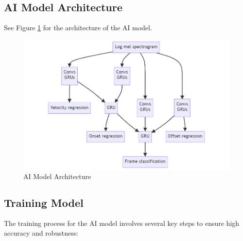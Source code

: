 \documentclass{article}
\begin{document}
\subsection{AI Model Architecture}
See Figure \ref{fig:ai_model_architecture} for the architecture of the AI model.

\begin{figure}[htbp]
    \centering
    \includegraphics[width=\textwidth]{../diagrams/ai_architecture.png}
    \caption{AI Model Architecture}
    \label{fig:ai_model_architecture}
\end{figure}

\subsection{Training Model}

The training process for the AI model involves several key steps to ensure high accuracy and robustness:
\end{document}

